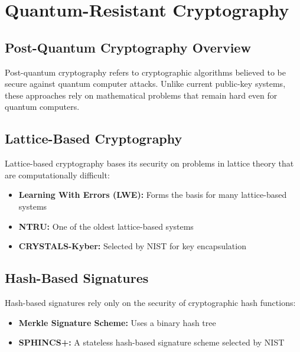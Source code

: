 \chapter{Quantum-Resistant Cryptography}

\section{Post-Quantum Cryptography Overview}
Post-quantum cryptography refers to cryptographic algorithms believed to be secure against quantum computer attacks. Unlike current public-key systems, these approaches rely on mathematical problems that remain hard even for quantum computers.

\section{Lattice-Based Cryptography}
Lattice-based cryptography bases its security on problems in lattice theory that are computationally difficult:

\begin{itemize}
    \item \textbf{Learning With Errors (LWE):} Forms the basis for many lattice-based systems
    \item \textbf{NTRU:} One of the oldest lattice-based systems
    \item \textbf{CRYSTALS-Kyber:} Selected by NIST for key encapsulation
\end{itemize}


\section{Hash-Based Signatures}
Hash-based signatures rely only on the security of cryptographic hash functions:

\begin{itemize}
    \item \textbf{Merkle Signature Scheme:} Uses a binary hash tree
    \item \textbf{SPHINCS+:} A stateless hash-based signature scheme selected by NIST
\end{itemize}

